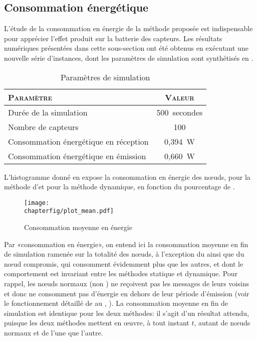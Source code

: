     \subsection{Consommation énergétique}

L'étude de la consommation en énergie de la méthode proposée est indispensable pour apprécier l'effet produit sur la batterie des capteurs.
Les résultats numériques présentées dans cette sous-section ont été obtenus en exécutant une nouvelle série d'instances, dont les paramètres de simulation sont synthétisés en .
\begin{table}[!b]
    \centering
    \caption{Paramètres de simulation}\label{sa:table:parametres2}
    \medskip
    \begin{tabular}{lc}
        \toprule
        \textsc{Paramètre}                    & \textsc{Valeur}\\
        \midrule
        Durée de la simulation                & 500~secondes\\
        Nombre de capteurs                    & 100\\
        Consommation énergétique en réception & 0,394~W\\
        Consommation énergétique en émission  & 0,660~W\\
        \bottomrule
    \end{tabular}
\end{table}

L'histogramme donné en  expose la consommation en énergie des nœuds, pour la méthode d'\elecstat et pour la méthode dynamique, en fonction du pourcentage de \cns.
\begin{figure}[ht]
    \centering
    \texttt{[image: \\chapterfig/plot\_mean.pdf]}
    \caption{Consommation moyenne en énergie}\label{sa:fig:conso-moyenne}
\end{figure}
Par «consommation en énergie», on entend ici la consommation moyenne en fin de simulation ramenée sur la totalité des nœuds, à l'exception du \ch ainsi que du nœud compromis, qui consomment évidemment plus que les autres, et dont le comportement est invariant entre les méthodes statique et dynamique.
Pour rappel, les nœuds normaux (non \cns) ne reçoivent pas les messages de leurs voisins et donc ne consomment pas d'énergie en dehors de leur période d'émission (voir le fonctionnement détaillé de \leach au , ).
La consommation moyenne en fin de simulation est identique pour les deux méthodes: il s'agit d'un résultat attendu, puisque les deux méthodes mettent en œuvre, à tout instant $t$, autant de nœuds normaux et de \cns l'une que l'autre.

